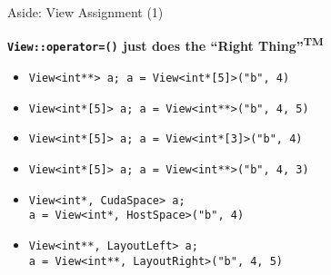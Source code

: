 
\begin{frame}[fragile]{Aside: View Assignment (1)}

  \textbf{\texttt{View::operator=()} just does the ``Right Thing''\textsuperscript{TM}}

  \vspace{5pt}

  \begin{itemize}
    \item{\texttt{View<int**> a; a = View<int*[5]>("b", 4)}}
    \pause
    {\color{darkgreen}{$=>$ Okay}}
    \pause
    \item{\texttt{View<int*[5]> a; a = View<int**>("b", 4, 5)}}\\
    \pause
    {\color{darkgreen}{$=>$ Okay, checked at runtime}}
    \pause
    \item{\texttt{View<int*[5]> a; a = View<int*[3]>("b", 4)}}\\
    \pause
    {\color{darkred}{$=>$ Compilation error}}
    \pause
    \item{\texttt{View<int*[5]> a; a = View<int**>("b", 4, 3)}}\\
    \pause
    {\color{darkred}{$=>$ Runtime error}}
    \pause
    \item{\texttt{View<int*, CudaSpace> a;}\\
    \texttt{a = View<int*, HostSpace>("b", 4)}}\\
    \pause
    {\color{darkred}{$=>$ Compilation error}}
    \item{\texttt{View<int**, LayoutLeft> a;}\\
    \texttt{a = View<int**, LayoutRight>("b", 4, 5)}}\\
    \pause
    {\color{darkred}{$=>$ Compilation error}}
  \end{itemize}

\end{frame}


